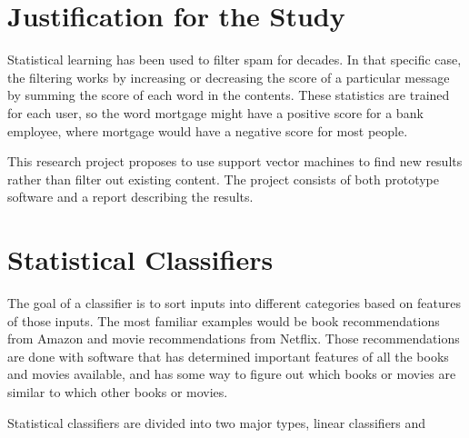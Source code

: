 \documentclass[12pt]{article}
\begin{document}
\section{Justification for the Study}
Statistical learning has been used to filter spam for decades. In that specific case, the filtering works by
increasing or decreasing the score of a particular message by summing the score of each word in the contents.
These statistics are trained for each user, so the word mortgage might have a positive score for a bank
employee, where mortgage would have a negative score for most people.

This research project proposes to use support vector machines to find new results rather than filter out
existing content. The project consists of both prototype software and a report describing the results.

\section{Statistical Classifiers}

The goal of a classifier is to sort inputs into different categories based on features of those inputs. The
most familiar examples would be book recommendations from Amazon and movie recommendations from Netflix. Those
recommendations are done with software that has determined important features of all the books and movies
available, and has some way to figure out which books or movies are similar to which other books or
movies. \cite{michie1994machine}

Statistical classifiers are divided into two major types, linear classifiers and 
\end{document}
